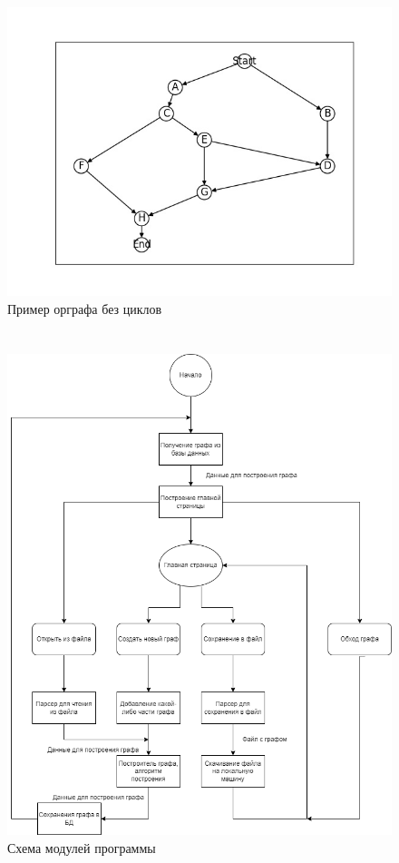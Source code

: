 \chapter{}\label{apx_a2}
\begin{figure}[h]
    \centering
    \includegraphics[width=0.55\linewidth]{images/graph.jpg}
    \caption{Пример орграфа без циклов}
    \label{fig:graph}
\end{figure}

\chapter{}\label{apx_a3}
\begin{figure}[h]
    \centering
    \includegraphics[width=0.7\linewidth]{images/module.png}
    \caption{Схема модулей программы}
    \label{fig:module}
\end{figure} 

